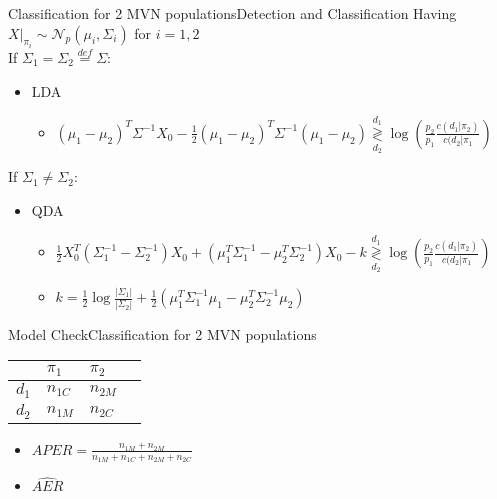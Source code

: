\documentclass[aspectratio=169,10pt,t]{beamer}
\newcommand\gldec[2]{
	\underset{#2}{\overset{#1}{\gtrless}}
}
\begin{document}
\begin{frame}{Classification for 2 MVN populations}{Detection and Classification}
    Having $X|_{\pi_i} \sim \mathcal{N}_p(\mu_i, \Sigma_i)$ for $i = 1, 2$ \\
    If $\Sigma_1 = \Sigma_2 \overset{def}{=} \Sigma$:
		\pause
    \begin{itemize}
        \item LDA
        \begin{itemize}
            \item $(\mu_1 - \mu_2)^T \Sigma^{-1}X_0 - \frac{1}{2}(\mu_1 - \mu_2)^T \Sigma^{-1}(\mu_1 - \mu_2)  \gldec{d_1}{d_2} \log(\frac{p_2}{p_1} \frac{c(d_1 | \pi_2)}{c(d_2 | \pi_1})$
        \end{itemize}
    \end{itemize}
		\pause
    If $\Sigma_1 \neq \Sigma_2$:
    \begin{itemize}
        \item QDA
        \begin{itemize}
            \item $
							\frac{1}{2} X_0^T(\Sigma_1^{-1} - \Sigma_2^{-1})X_0 + %
							\left( \mu_1^{T} \Sigma^{-1}_{1} - \mu_2^{T} \Sigma^{-1}_{2}  \right) X_0 -k
							\gldec{d_1}{d_2}
							\log(\frac{p_2}{p_1} \frac{c(d_1 | \pi_2)}{c(d_2 | \pi_1})
							$
						\item $
							k = \frac{1}{2}  \log \frac{| \Sigma_1 |}{| \Sigma_2 |} +
							\frac{1}{2}  \left( 
								\mu_1^{T}\Sigma_1^{-1}\mu_1
								-
								\mu_2^{T}\Sigma_2^{-1}\mu_2
								 \right) 
							$
        \end{itemize}
    \end{itemize}
\end{frame}

\begin{frame}{Model Check}{Classification for 2 MVN populations}
        \begin{table}[h]
        \begin{tabular}{@{}llll@{}}
        \toprule
              & $\pi_1$          & $\pi_2$          \\ \midrule
        $d_1$ & $n_{1C}$ & $n_{2M}$ \\
        $d_2$ & $n_{1M}$ & $n_{2C}$ \\ \midrule 
        \end{tabular}
        \end{table}
				\pause
    \begin{itemize}
        \item $APER = \frac{n_{1M} + n_{2M}}{n_{1M} + n_{1C} + n_{2M} + n_{2C}}$
    \end{itemize}
    \begin{itemize}
        \item $\hat{AER}$ 
    \end{itemize}
\end{frame}
\end{document}
